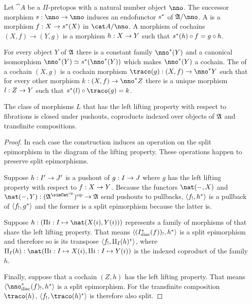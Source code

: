 \documentclass[csh.tex]{subfiles}
\begin{document}
\begin{definition} Let $\cat A$ be a $\Pi$-pretopos with a natural number object $\nno$. The successor morphism $s\of\nno\to\nno$ induces an endofunctor $s^*$ of $\ambient/\nno$. A  is a morphism $f: X\to s^*(X)$ in $\cat A/\nno$. A morphism of cochains $(X,f)\to(Y,g)$ is a morphism $h: X\to Y$ such that $s^*(h)\circ f = g\circ h$.

For every object $Y$ of $\mathfrak A$ there is a constant family $\nno\ri(Y)$ and a canonical isomorphism $\nno\ri(Y)\simeq s\ri(\nno\ri(Y))$ which makes $\nno\ri(Y)$ a cochain. The  of a cochain $(X,g)$ is a cochain morphism $\traco(g)\of (X,f)\to\nno\ri Y$ such that for every other morphism $k\of (X,f)\to\nno\ri Z$ there is a unique morphism $l: Z\to Y$ such that $s\ri(l)\circ \traco(g)=k$.
\end{definition}

\begin{lemma} The class of morphisms $L$ that has the left lifting property with respect to fibrations is closed under pushouts, coproducts indexed over objects of $\mathfrak A$ and transfinite compositions. \label{saturation}\end{lemma}

\begin{proof}
In each case the construction induces an operation on the split epimorphism in the diagram of the lifting property. These operations happen to preserve split epimorphisms.

Suppose $h: I'\to J'$ is a pushout of $g: I\to J$ where $g$ has the left lifting property with respect to $f: X\to Y$. Because the functors $\nat(-,X)$ and $\nat(-,Y)\of(\ambient\s)\dual\to\ambient$ send pushouts to pullbacks, $\left\langle f_!,h^* \right\rangle$ is a pullback of $\left\langle f_!,g^* \right\rangle$ and the former is a split epimorphism because the latter is.

Suppose $h\of(\product{i\of I}{\nat(X(i),Y(i))})$ represents a family of morphisms of that share the left lifting property. That means $\left\langle (I_{\rm disc}^*(f))_!,h^* \right\rangle$ is a split epimorphism and therefore so is its transpose $\left\langle f_!,\amalg_I(h)^* \right\rangle$, where $\amalg_I(h)\of\nat(\coproduct{i\of I}{X(i)},\coproduct{i\of I}{Y(i)})$ is the indexed coproduct of the family $h$.%

Finally, suppose that a cochain $(Z,h)$ has the left lifting property. That means $\tuplet{\nno\disc\ri(f)_!,h\ri}$ is a split epimorphism. For the transfinite composition $\traco(h)$, $\tuplet{f_!,\traco(h)\ri}$ is therefore also split.
\end{proof}
\end{document}
